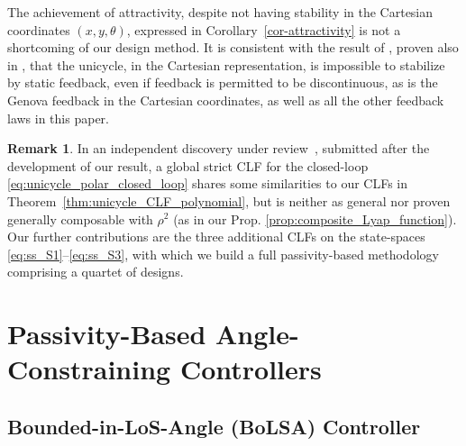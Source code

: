 \documentclass[journal,twoside,web]{ieeecolor}
\theoremstyle{definition}
\newtheorem{remark}{Remark}
\begin{document}
The achievement of attractivity, despite not having stability in the Cartesian coordinates $(x,y,\theta)$, expressed in Corollary~\ref{cor-attractivity} is not a shortcoming of our design method. It is consistent with the result of \cite[Remark 1.6]{coron1994relation}, proven also in \cite[pg. 43]{praly2022fonctions}, that the unicycle, in the Cartesian representation, is impossible to stabilize by static feedback, even if  feedback is permitted to be discontinuous, as is the Genova feedback in the Cartesian coordinates, %
as well as all the other feedback laws in this paper. 
\begin{remark}
    In an independent discovery under review~\cite{BoWang2025further}, submitted after the development of our result,  
a global strict CLF for the closed-loop \eqref{eq:unicycle_polar_closed_loop}
shares some similarities to our CLFs  in Theorem~\ref{thm:unicycle_CLF_polynomial}, but is neither as general nor proven generally composable with $\rho^2$ (as in our Prop. \ref{prop:composite_Lyap_function}). Our further contributions are the three additional CLFs on the state-spaces \eqref{eq:ss_S1}--\eqref{eq:ss_S3}, with which we build a full passivity-based methodology comprising a quartet of designs.
\end{remark}

 
\section{Passivity-Based Angle-Constraining Controllers}

\subsection{Bounded-in-LoS-Angle (BoLSA) Controller}\label{sec:BoLSA}
\end{document}
